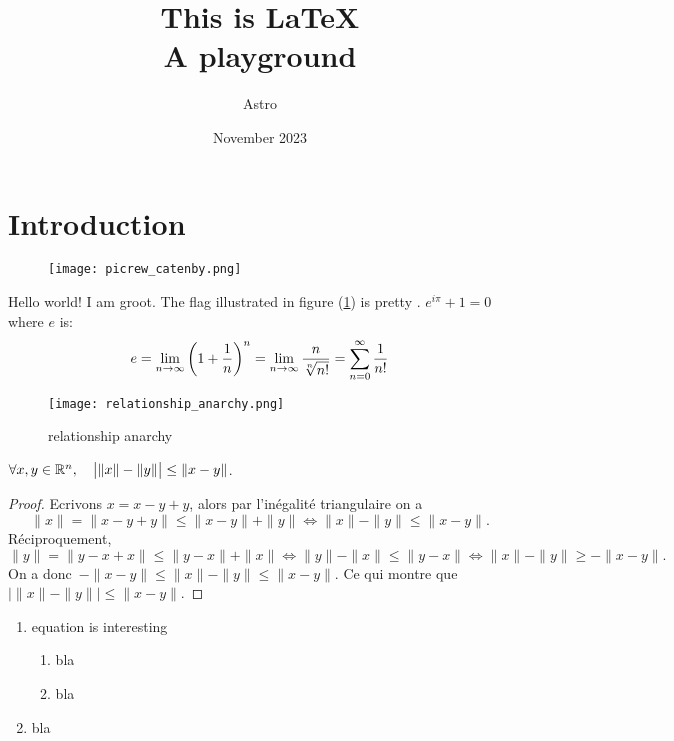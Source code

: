 \documentclass{article}
\title{This is \LaTeX \\ \vspace{1pt}\large{A playground}}
\author{Astro}
\date{November 2023}
\begin{document}
\maketitle
\tableofcontents

\section{Introduction}

\begin{wrapfigure}{r}[15pt]{0.25\textwidth}
	\texttt{[image: picrew\_catenby.png]}
\end{wrapfigure}
\lipsum[1-2]


Hello world! I am groot. The flag illustrated in figure (\ref{fig:relanark}) is pretty \anarchy . $e^{i\pi} + 1 = 0$ where $e$ is:
\begin{equation} \label{eq:e_def}
	e = \lim_{n \to \infty} \qty(1 + \frac{1}{n})^n = \lim_{n \to \infty} \frac{n}{\sqrt[n]{n!}} = \sum_{n=0}^{\infty} \frac{1}{n!}
\end{equation}

\begin{tcolorbox}[breakable, colback=orange!5, colframe=enby!65!white!80!black, title=This is a tcolorbox]
	\lipsum[1]
\end{tcolorbox}

\begin{figure}[H]
	\centering
	\texttt{[image: relationship\_anarchy.png]}
	\caption{relationship anarchy}
	\label{fig:relanark}
\end{figure}

\begin{prop}
	$\forall x,y \in \mathbb{R}^n, \quad \big|\|x\|-\|y\|\big|\le\|x-y\|$.
\end{prop}
\begin{proof}
	Ecrivons $x=x-y+y$, alors par l'inégalité triangulaire on a
	\[\|x\|=\|x-y+y\|\le\|x-y\|+\|y\| \iff \|x\|-\|y\|\le\|x-y\| \text{.}\]
	Réciproquement,	\[\|y\|=\|y-x+x\|\le\|y-x\|+\|x\| \iff \|y\|-\|x\|\le\|y-x\| \iff \|x\|-\|y\|\ge-\|x-y\| \text{.}\]
	On a donc\, $-\|x-y\|\le\|x\|-\|y\|\le\|x-y\|$. Ce qui montre que $\big|\|x\|-\|y\|\big|\le\|x-y\|$.
\end{proof}

\begin{enumerate}
	\item equation  is interesting
	      \begin{enumerate}
		      \item bla
		      \item bla
	      \end{enumerate}
	\item bla
\end{enumerate}
\end{document}
